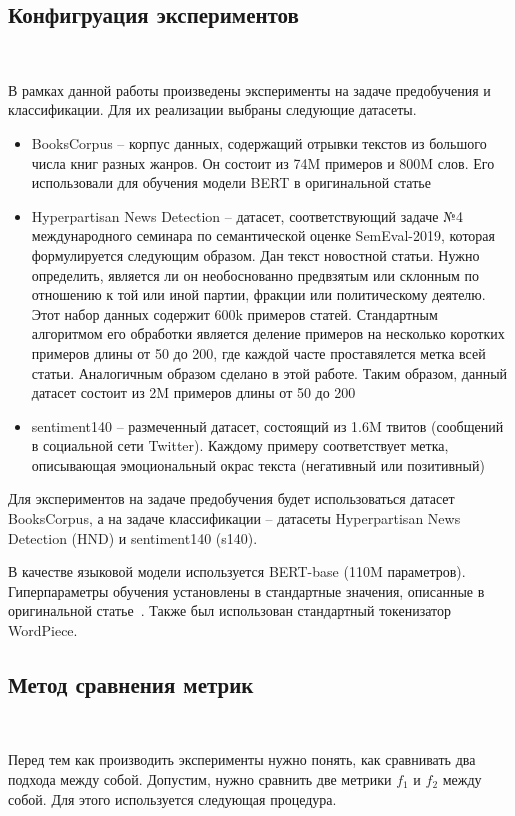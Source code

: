 \documentclass{spbau-diploma}
\begin{document}
\subsection{Конфигруация экспериментов}
\ 

В рамках данной работы произведены эксперименты на задаче предобучения и классификации. Для их реализации выбраны следующие датасеты.

\begin{itemize}
	\item BooksCorpus -- корпус данных, содержащий отрывки текстов из большого числа книг разных жанров. Он состоит из 74M примеров и 800M слов. Его использовали для обучения модели BERT в оригинальной статье~\cite{devlin2018bert}
	\item Hyperpartisan News Detection -- датасет, соответствующий задаче №4 международного семинара по семантической оценке SemEval-2019, которая формулируется следующим образом. Дан текст новостной статьи. Нужно определить, является ли он необоснованно предвзятым или склонным по отношению к той или иной партии, фракции или политическому деятелю. Этот набор данных содержит 600k примеров статей. Стандартным алгоритмом его обработки является деление примеров на несколько коротких примеров длины от 50 до 200, где каждой часте проставялется метка всей статьи. Аналогичным образом сделано в этой работе. Таким образом, данный датасет состоит из 2M примеров длины от 50 до 200
	\item sentiment140 -- размеченный датасет, состоящий из 1.6M твитов (сообщений в социальной сети Twitter). Каждому примеру соответствует метка, описывающая эмоциональный окрас текста (негативный или позитивный)
\end{itemize}

Для экспериментов на задаче предобучения будет использоваться датасет BooksCorpus, а на задаче классификации -- датасеты Hyperpartisan News Detection (HND) и sentiment140 (s140).

В качестве языковой модели используется BERT-base (110M параметров). Гиперпараметры обучения установлены в стандартные значения, описанные в оригинальной статье~\cite{devlin2018bert}. Также был использован стандартный токенизатор WordPiece.

\subsection{Метод сравнения метрик}
\ 

Перед тем как производить эксперименты нужно понять, как сравнивать два подхода между собой. Допустим, нужно сравнить две метрики $f_1$ и $f_2$ между собой. Для этого используется следующая процедура.
\end{document}
